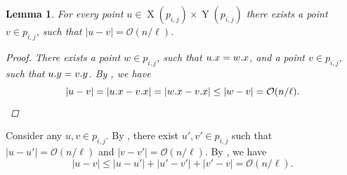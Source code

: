 \documentclass[11pt]{article}
\renewcommand{\O}{\mathcal{O}}
\theoremstyle{plain}
\newtheorem{lemma}{Lemma}
\theoremstyle{definition}
\theoremstyle{remark}
\DeclareMathOperator*{\X}{X}
\DeclareMathOperator*{\Y}{Y}
\begin{document}
\begin{lemma}\label{distance_bound_aux2}
	For every point $u \in \X(p_{i, j}) \times \Y(p_{i, j})$ there exists a point $v \in p_{i, j}$, such that $|u - v| = \O(n / \ell)$.
	\begin{proof}
		There exists a point $w \in p_{i, j}$, such that $u.x = w.x$, and a point $v \in p_{i, j}$, such that $u.y = v.y$.
		By , we have
		\[|u - v| = |\x{u} - \x{v}| = |\x{w} - \x{v}| \le |w - v| = \O(n / \ell).\] 
	\end{proof}
\end{lemma}

Consider any $u, v \in p_{i, j}$.
By , there exist $u', v' \in p_{i, j}$ such that $|u - u'| = \O(n / \ell)$ and $|v - v'| = \O(n / \ell)$.
By , we have
\[ |u - v| \le |u - u'| + |u' - v'| + |v' - v| = \O(n / \ell). \]



\end{document}
